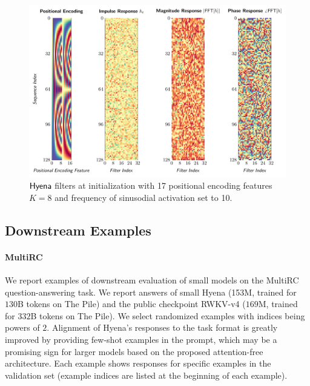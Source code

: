 \begin{figure}
    \centering
    \includegraphics[width=.9\linewidth]{figures/pos_enc_17_sin_freq_10.pdf}
    \caption{$\sf Hyena$ filters at initialization with 17 positional encoding features $K=8$ and frequency of sinusodial activation set to 10.}
    \label{fig:pos_enc_17_10}
\end{figure}

\clearpage

\subsection{Downstream Examples}

\paragraph{MultiRC}
%

We report examples of downstream evaluation of small models on the MultiRC question-answering task. We report answers of small {\sf Hyena} (153M, trained for $130$B tokens on {\sc The Pile}) and the public checkpoint RWKV-v4 \citep{PENG_RWKV-LM_2021} ($169$M, trained for $332$B tokens on {\sc The Pile}). We select randomized examples with indices being powers of $2$.
%
Alignment of {\sf Hyena}'s responses to the task format is greatly improved by providing few-shot examples in the prompt, which may be a promising sign for larger models based on the proposed attention-free architecture.
Each example shows responses for specific examples in the validation set (example indices are listed at the beginning of each example).

